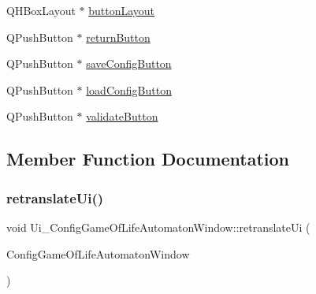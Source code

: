\begin{DoxyCompactItemize}
\item 
Q\+H\+Box\+Layout $\ast$ \mbox{\hyperlink{class_ui___config_game_of_life_automaton_window_a7a6cf314ed32637cbb20d1ed58224913}{button\+Layout}}
\item 
Q\+Push\+Button $\ast$ \mbox{\hyperlink{class_ui___config_game_of_life_automaton_window_a0155fb14da13ef5e40a4ba3bc7552c15}{return\+Button}}
\item 
Q\+Push\+Button $\ast$ \mbox{\hyperlink{class_ui___config_game_of_life_automaton_window_a55007024b695426d463662f883f39375}{save\+Config\+Button}}
\item 
Q\+Push\+Button $\ast$ \mbox{\hyperlink{class_ui___config_game_of_life_automaton_window_abe4762f9f3eac93cd14e46766ca3c894}{load\+Config\+Button}}
\item 
Q\+Push\+Button $\ast$ \mbox{\hyperlink{class_ui___config_game_of_life_automaton_window_a7ca9bf22242c028fb575be91157fe329}{validate\+Button}}
\end{DoxyCompactItemize}


\subsection{Member Function Documentation}
\mbox{\label{class_ui___config_game_of_life_automaton_window_adaefd039def47107d6a97580ada91acb}} 
\subsubsection{\texorpdfstring{retranslate\+Ui()}{retranslateUi()}}
{\footnotesize\ttfamily void Ui\+\_\+\+Config\+Game\+Of\+Life\+Automaton\+Window\+::retranslate\+Ui (\begin{DoxyParamCaption}\item[{Q\+Widget $\ast$}]{Config\+Game\+Of\+Life\+Automaton\+Window }\end{DoxyParamCaption})\hspace{0.3cm}{\ttfamily [inline]}}

\mbox{\label{class_ui___config_game_of_life_automaton_window_a0642d9a10f4bca0336a460c82d23e603}} 
